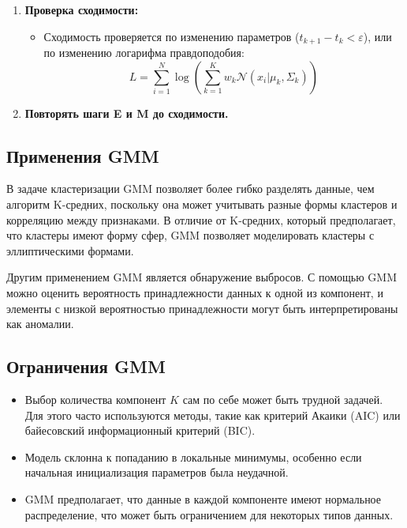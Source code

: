 \begin{enumerate}
    \item \textbf{Проверка сходимости:}
          \begin{itemize}
              \item Сходимость проверяется по изменению параметров ($t_{k+1} - t_k < \varepsilon$), или по изменению логарифма правдоподобия:
                    \[
                        L = \sum_{i=1}^{N} \log \left( \sum_{k=1}^{K} w_k \mathcal{N}(x_i | \mu_k, \Sigma_k) \right)
                    \]

          \end{itemize}

    \item \textbf{Повторять шаги E и M до сходимости.}
\end{enumerate}


\subsection{Применения GMM}

В задаче кластеризации GMM позволяет более гибко разделять данные, чем алгоритм K-средних, поскольку она может учитывать разные формы кластеров и корреляцию между признаками. В отличие от K-средних, который предполагает, что кластеры имеют форму сфер, GMM позволяет моделировать кластеры с эллиптическими формами.

Другим применением GMM является обнаружение выбросов. С помощью GMM можно оценить вероятность принадлежности данных к одной из компонент, и элементы с низкой вероятностью принадлежности могут быть интерпретированы как аномалии.

\subsection{Ограничения GMM}

\begin{itemize}
    \item Выбор количества компонент $K$ сам по себе может быть трудной задачей. Для этого часто используются методы, такие как критерий Акаики (AIC) или байесовский информационный критерий (BIC).
    \item Модель склонна к попаданию в локальные минимумы, особенно если начальная инициализация параметров была неудачной.
    \item GMM предполагает, что данные в каждой компоненте имеют нормальное распределение, что может быть ограничением для некоторых типов данных.
\end{itemize}

